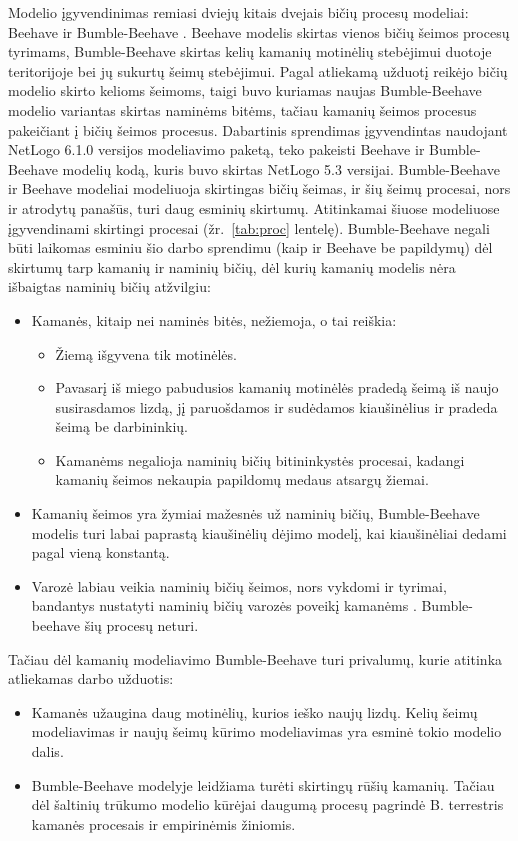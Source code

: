 \documentclass{VUMIFKompMagistrinis}
\begin{document}
Modelio įgyvendinimas remiasi dviejų kitais dvejais bičių procesų modeliai: Beehave \cite{BGT14} ir Bumble-Beehave \cite{BDP18}. Beehave modelis skirtas vienos bičių šeimos procesų tyrimams, Bumble-Beehave skirtas kelių kamanių motinėlių stebėjimui duotoje teritorijoje bei jų sukurtų šeimų stebėjimui. Pagal atliekamą užduotį reikėjo bičių modelio skirto kelioms šeimoms, taigi buvo kuriamas naujas Bumble-Beehave modelio variantas skirtas naminėms bitėms, tačiau kamanių šeimos procesus pakeičiant į bičių šeimos procesus. Dabartinis sprendimas įgyvendintas naudojant NetLogo 6.1.0 versijos modeliavimo paketą, teko pakeisti Beehave ir Bumble-Beehave modelių kodą, kuris buvo skirtas NetLogo 5.3 versijai.
Bumble-Beehave ir Beehave modeliai modeliuoja skirtingas bičių šeimas, ir šių šeimų procesai, nors ir atrodytų panašūs, turi daug esminių skirtumų. Atitinkamai šiuose modeliuose įgyvendinami skirtingi procesai (žr.~\ref{tab:proc} lentelę).
Bumble-Beehave negali būti laikomas esminiu šio darbo sprendimu (kaip ir Beehave be papildymų) dėl skirtumų tarp kamanių ir naminių bičių, dėl kurių kamanių modelis nėra išbaigtas naminių bičių atžvilgiu:
\begin{itemize}
\item Kamanės, kitaip nei naminės bitės, nežiemoja, o tai reiškia:
\begin{itemize}
\item Žiemą išgyvena tik motinėlės.
\item Pavasarį iš miego pabudusios kamanių motinėlės pradedą šeimą iš naujo susirasdamos lizdą, jį paruošdamos ir sudėdamos kiaušinėlius ir pradeda šeimą be darbininkių. 
\item Kamanėms negalioja naminių bičių bitininkystės procesai, kadangi kamanių šeimos nekaupia papildomų medaus atsargų žiemai.
\end{itemize}
\item Kamanių šeimos yra žymiai mažesnės už naminių bičių, Bumble-Beehave modelis turi labai paprastą kiaušinėlių dėjimo modelį, kai kiaušinėliai dedami pagal vieną konstantą.
\item Varozė labiau veikia naminių bičių šeimos, nors vykdomi ir tyrimai, bandantys nustatyti naminių bičių varozės poveikį kamanėms \cite{MTD19}. Bumble-beehave šių procesų neturi. 
\end{itemize}

Tačiau dėl kamanių modeliavimo Bumble-Beehave turi privalumų, kurie atitinka atliekamas darbo užduotis:
\begin{itemize}
\item Kamanės užaugina daug motinėlių, kurios ieško naujų lizdų. Kelių šeimų modeliavimas ir naujų šeimų kūrimo modeliavimas yra esminė tokio modelio dalis.
\item Bumble-Beehave modelyje leidžiama turėti skirtingų rūšių kamanių. Tačiau dėl šaltinių trūkumo modelio kūrėjai daugumą procesų pagrindė B. terrestris kamanės procesais ir empirinėmis žiniomis.
\end{itemize}
\end{document}

